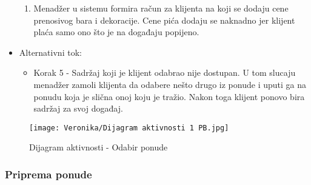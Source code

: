 \documentclass[a4paper]{article}
\begin{document}
\begin{itemize}
\begin{enumerate}
		    \item Menadžer u sistemu formira račun za klijenta na koji se dodaju cene prenosivog bara i dekoracije. Cene pića dodaju se naknadno jer klijent plaća samo ono što je na događaju popijeno.
        \end{enumerate}
    \item Alternativni tok:
        \begin{itemize}
            \item Korak 5 - Sadržaj koji je klijent odabrao nije dostupan. U tom slucaju menadžer zamoli klijenta da odabere nešto drugo iz ponude i uputi ga na ponudu koja je slična onoj koju je tražio. Nakon toga klijent ponovo bira sadržaj za svoj događaj.
        \end{itemize}
\end{itemize}


\begin{figure}[H]
    \centering
    \texttt{[image: Veronika/Dijagram aktivnosti 1 PB.jpg]}
    \caption{Dijagram aktivnosti - Odabir ponude}
    \label{fig:PrenosiviBar}
\end{figure}


\subsubsection{Priprema ponude}
\end{document}
